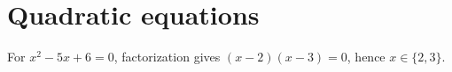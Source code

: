\documentclass{article}
\begin{document}
\section{Quadratic equations}
\begin{example}
For $x^2-5x+6=0$, factorization gives $(x-2)(x-3)=0$, hence
$x\in\{2,3\}$.
\end{example}
\end{document}
